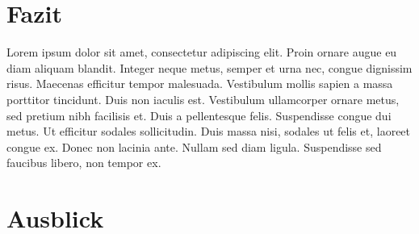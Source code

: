 
\chapter{Fazit}

Lorem ipsum dolor sit amet, consectetur adipiscing elit.
Proin ornare augue eu diam aliquam blandit.
Integer neque metus, semper et urna nec, congue dignissim risus.
Maecenas efficitur tempor malesuada.
Vestibulum mollis sapien a massa porttitor tincidunt.
Duis non iaculis est.
Vestibulum ullamcorper ornare metus, sed pretium nibh facilisis et.
Duis a pellentesque felis.
Suspendisse congue dui metus.
Ut efficitur sodales sollicitudin.
Duis massa nisi, sodales ut felis et, laoreet congue ex.
Donec non lacinia ante.
Nullam sed diam ligula.
Suspendisse sed faucibus libero, non tempor ex. 

\chapter{Ausblick}